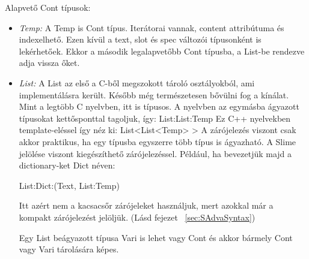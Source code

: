 Alapvető Cont típusok:
\begin{itemize}
\item \emph{Temp:} 
A Temp is Cont típus. 
Iterátorai vannak, content attribútuma és indexelhető.
Ezen kívül a text, slot és spec változói típusonként is lekérhetőek.
Ekkor a második legalapvetőbb Cont típusba, a List-be rendezve adja vissza őket.
\item \emph{List:} 
A List az első a C-ből megszokott tároló osztályokból, ami implementálásra került.
Később még természetesen bővülni fog a kínálat.
Mint a legtöbb C nyelvben, itt is típusos.
A nyelvben az egymásba ágyazott típusokat kettősponttal tagoljuk, így: List:List:Temp
Ez C++ nyelvekben template-eléssel így néz ki: List<List<Temp> >
A zárójelezés viszont csak akkor praktikus, ha egy típusba egyszerre több típus is ágyazható. 
A Slime jelölése viszont kiegészíthető zárójelezéssel. 
Például, ha bevezetjük majd a dictionary-ket Dict néven:

List:Dict:(Text, List:Temp)

Itt azért nem a kacsacsőr zárójeleket használjuk, mert azokkal már a kompakt zárójelezést jelöljük. (Lásd fejezet ~\ref{sec:SAdvaSyntax})

Egy List beágyazott típusa Vari is lehet vagy Cont és akkor bármely Cont vagy Vari tárolására képes.


\end{itemize}
